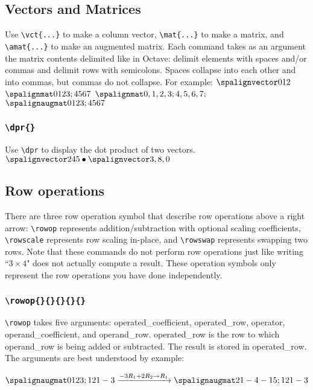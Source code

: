 \documentclass{article}
\begin{document}
\subsection{Vectors and Matrices}
Use \verb=\vct{...}= to make a column vector, \verb=\mat{...}= to make a matrix, and \verb=\amat{...}= to make an augmented matrix. Each command takes as an argument the matrix contents delimited like in Octave: delimit elements with spaces and/or commas and delimit rows with semicolons. Spaces collapse into each other and into commas, but commas do not collapse. For example:
\LTXexample[style=A]
$\vct{0 1 2}$
\endLTXexample
\LTXexample[style=A]
$\mat{0 1 2 3; 4 5 6 7}$
\endLTXexample
\LTXexample[style=A]
$\mat{0,1 , 2 ,  3;4,5,6,7  ;}$
\endLTXexample
\LTXexample[style=A]
$\amat{0 1 2 3; 4 5 6 7}$
\endLTXexample
\subsubsection{\texttt{\textbackslash dpr\{\}}}
Use \verb=\dpr= to display the dot product of two vectors.
\LTXexample[style=A]
$\dpr{2 4 5}{3, 8, 0}$
\endLTXexample

\subsection{Row operations}
There are three row operation symbol that describe row operations above a right arrow: \verb=\rowop= represents addition/subtraction with optional scaling coefficients, \verb=\rowscale= represents row scaling in-place, and \verb=\rowswap= represents swapping two rows. Note that these commands do not perform row operations just like writing ``$3\times 4$" does not actually compute a result. These operation symbols only represent the row operations you have done independently.

\subsubsection{\texttt{\textbackslash rowop\{\}\{\}\{\}\{\}\{\}}}

\verb=\rowop= takes five arguments: operated\_coefficient, operated\_row, operator, operand\_coefficient, and operand\_row. operated\_row is the row to which operand\_row is being added or subtracted. The result is stored in operated\_row. The arguments are best understood by example:

\LTXexample[style=A]
\[\amat{0 1 2 3; 1 2 1 -3}
\rowop{-3}{1}{+}{2}{2}
\amat{2 1 -4 -15; 1 2 1 -3}\]
\endLTXexample
\end{document}
